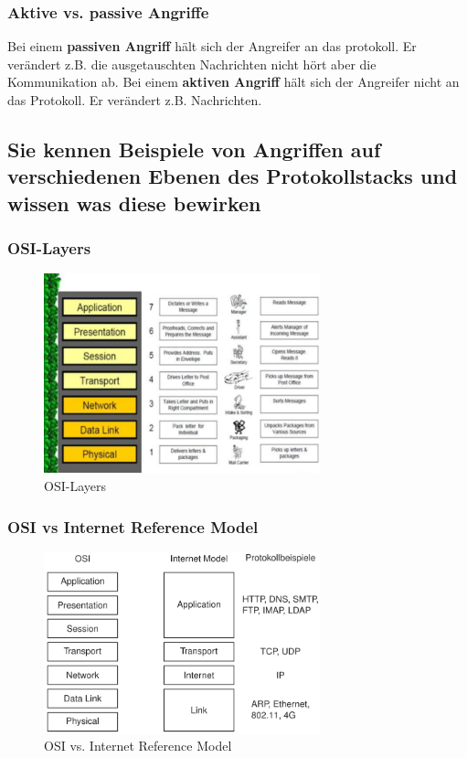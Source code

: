 \documentclass[10pt,a4paper]{article}
\begin{document}
\subsubsection*{Aktive vs. passive Angriffe}
Bei einem \textbf{passiven Angriff} hält sich der Angreifer an das protokoll. Er verändert z.B. die ausgetauschten Nachrichten nicht hört aber die Kommunikation ab.
Bei einem \textbf{aktiven Angriff} hält sich der Angreifer nicht an das Protokoll. Er verändert z.B. Nachrichten.

\subsection*{Sie kennen Beispiele von Angriffen auf verschiedenen Ebenen des Protokollstacks und wissen was diese bewirken}


\subsubsection*{OSI-Layers}
\begin{figure}[H]
    \begin{center}
    \includegraphics[width=8cm]{images/OSI-Layers.png}
    \caption{OSI-Layers}
    \label{OSI-Layers}
    \end{center}
\end{figure}

\subsubsection*{OSI vs Internet Reference Model}
\begin{figure}[H]
    \begin{center}
    \includegraphics[width=8cm]{images/OSIvsIRM.png}
    \caption{OSI vs. Internet Reference Model}
    \label{OSIvsIRM}
    \end{center}
\end{figure}
\end{document}
